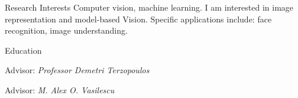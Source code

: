 \documentclass{resume}
\begin{document}
\maketitle
\thispagestyle{empty} %

\vspace{-0.5em}

\begin{component}{Research Interests}
Computer vision, machine learning.
I am interested in image representation and model-based Vision.
Specific applications include: face recognition, image understanding.
\end{component}

\vspace{0.5em}

\begin{component}{Education}

    \hspace{2em} Advisor: \emph{Professor Demetri Terzopoulos}

    \hspace{2em} Advisor: \emph{M. Alex O. Vasilescu}
    
\end{component}

\vspace{0.5em}
\end{document}
